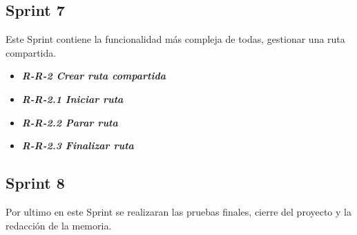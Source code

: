 \subsection{Sprint 7}
Este Sprint contiene la funcionalidad más compleja de todas, gestionar una ruta compartida.

\begin{itemize}
\item \textbf{\textit{R-R-2 Crear ruta compartida}}
\item \textbf{\textit{R-R-2.1 Iniciar ruta}}
\item \textbf{\textit{R-R-2.2 Parar ruta}}
\item \textbf{\textit{R-R-2.3 Finalizar ruta}}
\end{itemize}

\subsection{Sprint 8}

Por ultimo en este Sprint se realizaran las pruebas finales, cierre del proyecto y la redacción de la memoria.

